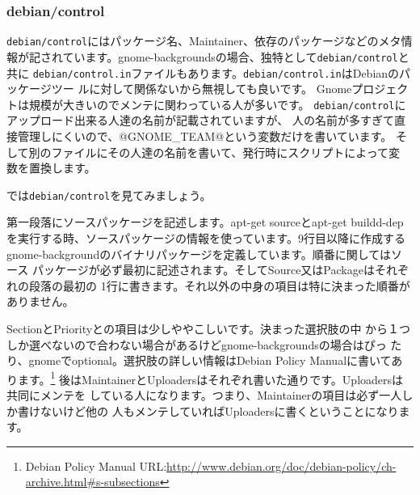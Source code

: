\documentclass[mingoth,a4paper]{jsarticle}
\begin{document}
\subsubsection{debian/control}

\texttt{debian/control}にはパッケージ名、Maintainer、依存のパッケージなどのメタ情
報が記されています。gnome-backgroundsの場合、独特として\texttt{debian/control}と共に
\texttt{debian/control.in}ファイルもあります。\texttt{debian/control.in}はDebianのパッケージツー
ルに対して関係ないから無視しても良いです。
Gnomeプロジェクトは規模が大きいのでメンテに関わっている人が多いです。
\texttt{debian/control}にアップロード出来る人達の名前が記載されていますが、
人の名前が多すぎて直接管理しにくいので、@GNOME\_TEAM@という変数だけを書いています。
そして別のファイルにその人達の名前を書いて、発行時にスクリプトによって変
数を置換します。

では\texttt{debian/control}を見てみましょう。

第一段落にソースパッケージを記述します。apt-get sourceとapt-get buildd-dep
を実行する時、ソースパッケージの情報を使っています。9行目以降に作成する
gnome-backgroundのバイナリパッケージを定義しています。順番に関してはソース
パッケージが必ず最初に記述されます。そしてSource又はPackageはそれぞれの段落の最初の
1行に書きます。それ以外の中身の項目は特に決まった順番がありません。

SectionとPriorityとの項目は少しややこしいです。決まった選択肢の中
から１つしか選べないので合わない場合があるけどgnome-backgroundsの場合はぴっ
たり、gnomeでoptional。選択肢の詳しい情報はDebian Policy Manualに書いてあ
ります。\footnote{Debian Policy Manual
URL:\url{http://www.debian.org/doc/debian-policy/ch-archive.html\#s-subsections}}
後はMaintainerとUploadersはそれぞれ書いた通りです。Uploadersは共同にメンテを
している人になります。つまり、Maintainerの項目は必ず一人しか書けないけど他の
人もメンテしていればUploadersに書くということになります。
\end{document}
